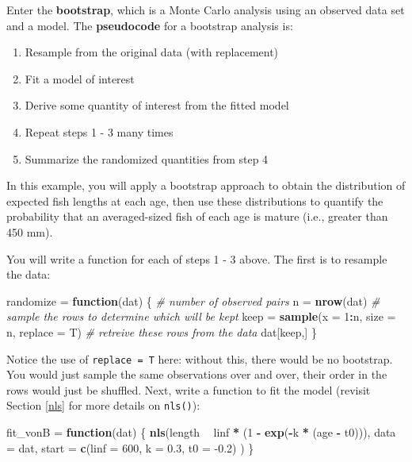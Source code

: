 \documentclass[]{book}
\newenvironment{Shaded}{\begin{snugshade}}{\end{snugshade}}
\newcommand{\CommentTok}[1]{\textcolor[rgb]{0.56,0.35,0.01}{\textit{#1}}}
\newcommand{\ControlFlowTok}[1]{\textcolor[rgb]{0.13,0.29,0.53}{\textbf{#1}}}
\newcommand{\DataTypeTok}[1]{\textcolor[rgb]{0.13,0.29,0.53}{#1}}
\newcommand{\DecValTok}[1]{\textcolor[rgb]{0.00,0.00,0.81}{#1}}
\newcommand{\FloatTok}[1]{\textcolor[rgb]{0.00,0.00,0.81}{#1}}
\newcommand{\KeywordTok}[1]{\textcolor[rgb]{0.13,0.29,0.53}{\textbf{#1}}}
\newcommand{\NormalTok}[1]{#1}
\newcommand{\OperatorTok}[1]{\textcolor[rgb]{0.81,0.36,0.00}{\textbf{#1}}}
\newcommand{\StringTok}[1]{\textcolor[rgb]{0.31,0.60,0.02}{#1}}
\providecommand{\tightlist}{%
  \setlength{\itemsep}{0pt}\setlength{\parskip}{0pt}}
\begin{document}
Enter the \textbf{bootstrap}, which is a Monte Carlo analysis using an observed data set and a model. The \textbf{pseudocode} for a bootstrap analysis is:

\begin{enumerate}
\def\labelenumi{\arabic{enumi}.}
\tightlist
\item
  Resample from the original data (with replacement)
\item
  Fit a model of interest
\item
  Derive some quantity of interest from the fitted model
\item
  Repeat steps 1 - 3 many times
\item
  Summarize the randomized quantities from step 4
\end{enumerate}

In this example, you will apply a bootstrap approach to obtain the distribution of expected fish lengths at each age, then use these distributions to quantify the probability that an averaged-sized fish of each age is mature (i.e., greater than 450 mm).

You will write a function for each of steps 1 - 3 above. The first is to resample the data:

\begin{Shaded}
\begin{Highlighting}[]
\NormalTok{randomize =}\StringTok{ }\ControlFlowTok{function}\NormalTok{(dat) \{}
  \CommentTok{# number of observed pairs}
\NormalTok{  n =}\StringTok{ }\KeywordTok{nrow}\NormalTok{(dat)}
  \CommentTok{# sample the rows to determine which will be kept}
\NormalTok{  keep =}\StringTok{ }\KeywordTok{sample}\NormalTok{(}\DataTypeTok{x =} \DecValTok{1}\OperatorTok{:}\NormalTok{n, }\DataTypeTok{size =}\NormalTok{ n, }\DataTypeTok{replace =}\NormalTok{ T)}
  \CommentTok{# retreive these rows from the data}
\NormalTok{  dat[keep,]}
\NormalTok{\}}
\end{Highlighting}
\end{Shaded}

Notice the use of \texttt{replace\ =\ T} here: without this, there would be no bootstrap. You would just sample the same observations over and over, their order in the rows would just be shuffled. Next, write a function to fit the model (revisit Section \ref{nls} for more details on \texttt{nls()}):

\begin{Shaded}
\begin{Highlighting}[]
\NormalTok{fit_vonB =}\StringTok{ }\ControlFlowTok{function}\NormalTok{(dat) \{}
  \KeywordTok{nls}\NormalTok{(length }\OperatorTok{~}\StringTok{ }\NormalTok{linf }\OperatorTok{*}\StringTok{ }\NormalTok{(}\DecValTok{1} \OperatorTok{-}\StringTok{ }\KeywordTok{exp}\NormalTok{(}\OperatorTok{-}\NormalTok{k }\OperatorTok{*}\StringTok{ }\NormalTok{(age }\OperatorTok{-}\StringTok{ }\NormalTok{t0))),}
      \DataTypeTok{data =}\NormalTok{ dat,}
      \DataTypeTok{start =} \KeywordTok{c}\NormalTok{(}\DataTypeTok{linf =} \DecValTok{600}\NormalTok{, }\DataTypeTok{k =} \FloatTok{0.3}\NormalTok{, }\DataTypeTok{t0 =} \FloatTok{-0.2}\NormalTok{)}
\NormalTok{      )}
\NormalTok{\}}
\end{Highlighting}
\end{Shaded}
\end{document}
